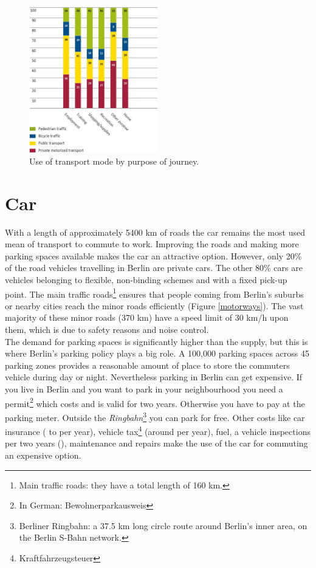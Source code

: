 \begin{figure}[h]
	\includegraphics[width=0.5\textwidth]{MobilityInTheCityJPG/Graphs/UseOfTransportPurpose.jpg}
	\centering
	\caption{Use of transport mode by purpose of journey.\cite{MobilityCity}}
\end{figure}
\section{Car}

With a length of approximately 5400 km of roads the car remains the most used mean of transport to commute to work. Improving the roads and making more parking spaces available makes the car an attractive option. However, only 20\% of the road vehicles travelling in Berlin are private cars. The other 80\% cars are vehicles belonging to flexible, non-binding schemes and with a fixed pick-up point.  The main traffic roads\footnote{Main traffic roads: they have a total length of 160 km.} ensures that people coming from Berlin's suburbs or nearby cities reach the minor roads efficiently (Figure \ref{motorways}). The vast majority of these minor roads (370 km) have a speed limit of 30 km/h upon them, which is due to safety reasons and noise control\cite{MobilityCity}. \\ \newline
The demand for parking spaces is significantly higher than the supply, but this is where Berlin's parking policy plays a big role. A 100,000 parking spaces across 45 parking zones provides a reasonable amount of place to store the commuters vehicle during day or night. Nevertheless parking in Berlin can get expensive. If you live in Berlin and you want to park in your neighbourhood you need a permit\footnote{In German: Bewohnerparkausweis} which costs  and is valid for two years. Otherwise you have to pay at the parking meter. Outside the \textit{Ringbahn}\footnote{Berliner Ringbahn: a 37.5 km long circle route around Berlin's inner area, on the Berlin S-Bahn network.} you can park for free. Other costs like car insurance ( to  per year), vehicle tax\footnote{Kraftfahrzeugsteuer} (around  per year), fuel, a vehicle inspections per two years (), maintenance and repairs make the use of the car for commuting an expensive option\cite{CostCars}.

